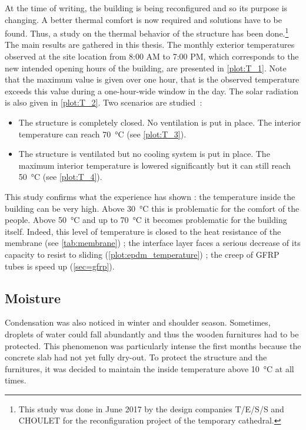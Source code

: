 At the time of writing, the building is being reconfigured and so its purpose is changing. A better thermal comfort is now required and solutions have to be found. Thus, a study on the thermal behavior of the structure has been done.\footnote{This study was done in June 2017 by the design companies T/E/S/S and CHOULET for the reconfiguration project of the temporary cathedral.} The main results are gathered in this thesis. The monthly exterior temperatures observed at the site location from 8:00 AM to 7:00 PM, which corresponds to the new intended opening hours of the building, are presented in \cref{plot:T_1}. Note that the maximum value is given over one hour, that is the observed temperature exceeds this value during a one-hour-wide window in the day. The solar radiation is also given in \cref{plot:T_2}. Two scenarios are studied~:
\begin{itemize}
\item The structure is completely closed. No ventilation is put in place. The interior temperature can reach \SI{70}{\celsius} (see \cref{plot:T_3}).
\item The structure is ventilated but no cooling system is put in place. The maximum interior temperature is lowered significantly but it can still reach \SI{50}{\celsius} (see \cref{plot:T_4}).
\end{itemize}

This study confirms what the experience has shown : the temperature inside the building can be very high. Above \SI{30}{\celsius} this is problematic for the comfort of the people. Above \SI{50}{\celsius} and up to \SI{70}{\celsius} it becomes problematic for the building itself. Indeed, this level of temperature is closed to the heat resistance of the membrane (see \cref{tab:membrane}) ; the interface layer faces a serious decrease of its capacity to resist to sliding (\cref{plot:epdm_temperature}) ; the creep of GFRP tubes is speed up (\cref{sec=gfrp}).

\subsection{Moisture}
Condensation was also noticed in winter and shoulder season. Sometimes, droplets of water could fall abundantly and thus the wooden furnitures had to be protected. This phenomenon was particularly intense the first months because the concrete slab had not yet fully dry-out. To protect the structure and the furnitures, it was decided to maintain the inside temperature above \SI{10}{\celsius} at all times.


